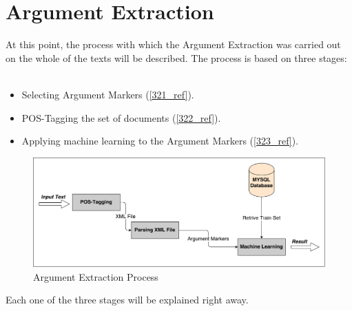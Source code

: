 \section{Argument Extraction}\label{32_ref}
At this point, the process with which the Argument Extraction was carried out on the whole of the texts will be described. The process is based on three stages:\\
\\
\begin{itemize}

	\item Selecting Argument Markers (\ref{321_ref}).
	\item POS-Tagging the set of documents (\ref{322_ref}).
	\item Applying machine learning  to the Argument Markers (\ref{323_ref}).\\

\end{itemize}

\begin{figure}[H]
\centering
\includegraphics[width=1\linewidth]{figure/methods/argument_extraction.pdf}
\caption{Argument Extraction Process}
\end{figure}

Each one of the three stages will be explained right away.

